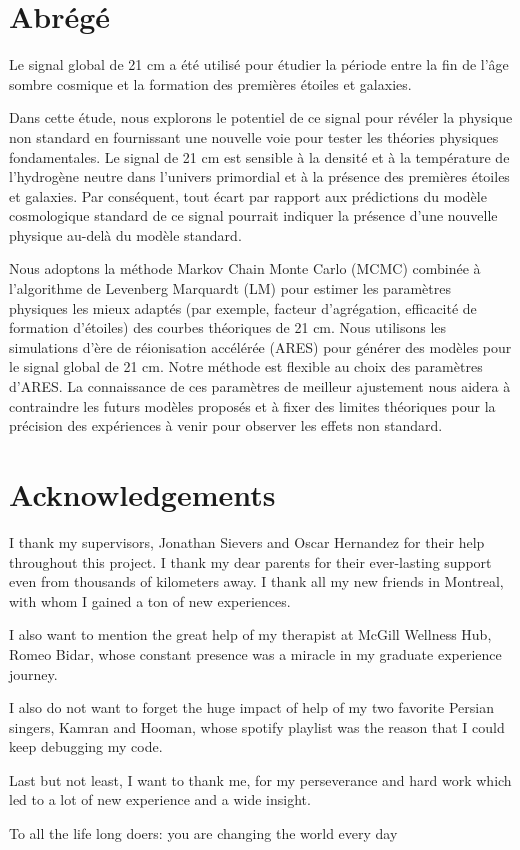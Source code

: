 \documentclass[12pt, TexShade, letterpaper]{report}
\begin{document}
\chapter*{Abrégé}
	\label{chap:frAbstract}
Le signal global de 21 cm a été utilisé pour étudier la période entre la fin de l'âge sombre cosmique et la formation des premières étoiles et galaxies. \par
Dans cette étude, nous explorons le potentiel de ce signal pour révéler la physique non standard en fournissant une nouvelle voie pour tester les théories physiques fondamentales. Le signal de 21 cm est sensible à la densité et à la température de l'hydrogène neutre dans l'univers primordial et à la présence des premières étoiles et galaxies. Par conséquent, tout écart par rapport aux prédictions du modèle cosmologique standard de ce signal pourrait indiquer la présence d'une nouvelle physique au-delà du modèle standard.\par
Nous adoptons la méthode Markov Chain Monte Carlo (MCMC) combinée à l'algorithme de Levenberg Marquardt (LM) pour estimer les paramètres physiques les mieux adaptés (par exemple, facteur d'agrégation, efficacité de formation d'étoiles) des courbes théoriques de 21 cm. Nous utilisons les simulations d'ère de réionisation accélérée (ARES) pour générer des modèles pour le signal global de 21 cm. Notre méthode est flexible au choix des paramètres d'ARES.
La connaissance de ces paramètres de meilleur ajustement nous aidera à contraindre les futurs modèles proposés et à fixer des limites théoriques pour la précision des expériences à venir pour observer les effets non standard.\par
\chapter*{Acknowledgements}
	\label{chap:acknowledgments}
I thank my supervisors, Jonathan Sievers and Oscar Hernandez for their help throughout this project. I thank my dear parents for their ever-lasting support even from thousands of kilometers away. I thank all my new friends in Montreal, with whom I gained a ton of new experiences.\par
I also want to mention the great help of my therapist at McGill Wellness Hub, Romeo Bidar, whose constant presence was a miracle in my graduate experience journey.\par
I also do not want to forget the huge impact of help of my two favorite Persian singers, Kamran and Hooman, whose spotify playlist was the reason that I could keep debugging my code. \par
 Last but not least, I want to thank me, for my perseverance and hard work which led to a lot of new experience and a wide insight.\par
 To all the life long doers: you are changing the world every day
	\tableofcontents\thispagestyle{plain}
\end{document}
